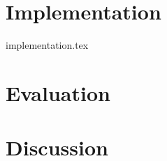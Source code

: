 \documentclass[12pt, a4paper]{report}
\begin{document}
\chapter{Implementation} \label{chapter:implementation}
{implementation.tex}

\chapter{Evaluation} \label{chapter:evaluation}

\chapter{Discussion} \label{chapter:discussion}

\onecolumn
{}
\printbibliography[title = {References}]
\end{document}
